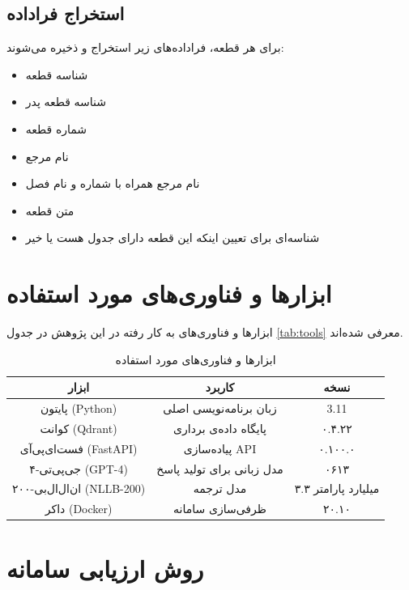 \subsection{استخراج فراداده}

برای هر قطعه، فراداده‌های زیر استخراج و ذخیره می‌شوند:

\begin{itemize}
\item شناسه قطعه
\item شناسه قطعه پدر
\item شماره قطعه
\item نام مرجع
\item نام مرجع همراه با شماره و نام فصل
\item متن قطعه
\item شناسه‌ای برای تعیین اینکه این قطعه دارای جدول هست یا خیر
\end{itemize}


\section{ابزارها و فناوری‌های مورد استفاده}

ابزارها و فناوری‌های به کار رفته در این پژوهش در جدول \eqref{tab:tools} معرفی شده‌اند.

\begin{table}[ht]
\caption{ابزارها و فناوری‌های مورد استفاده}
\label{tab:tools}
\centering
\onehalfspacing
\begin{tabular}{|c|c|c|}
\hline
\textbf{ابزار} & \textbf{کاربرد} & \textbf{نسخه} \\
\hline
پایتون (Python) & زبان برنامه‌نویسی اصلی & 3.11 \\
\hline
کوانت (Qdrant) & پایگاه داده‌ی برداری & ۰.۴.۲۲ \\
\hline
فست‌ای‌پی‌آی (FastAPI) & پیاده‌سازی API & ۰.۱۰۰.۰ \\
\hline
جی‌پی‌تی-۴ (GPT-4) & مدل زبانی برای تولید پاسخ & ۰۶۱۳ \\
\hline
ان‌ال‌ال‌بی-۲۰۰ (NLLB-200) & مدل ترجمه & ۳.۳ میلیارد پارامتر \\
\hline
داکر (Docker) & ظرفی‌سازی سامانه & ۲۰.۱۰ \\
\hline
\end{tabular} 
\end{table}


\section{روش ارزیابی سامانه}

